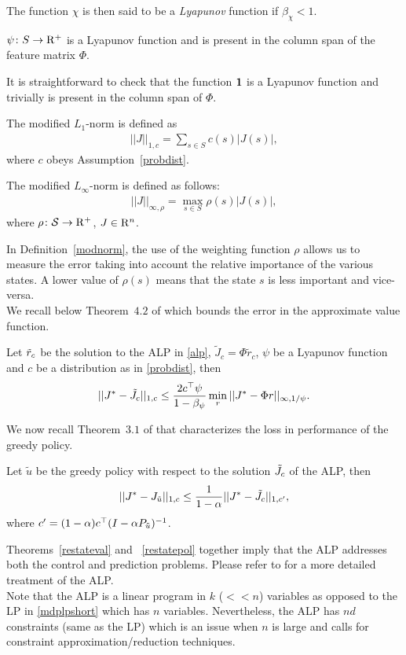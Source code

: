 \begin{definition}
The function $\chi$ is then said to be a \emph{Lyapunov} function if $\beta_{\chi}<1$.
\end{definition}
\begin{assumption}\label{lyap}
$\psi\colon S \rightarrow \mathrm{R}^+$ is a Lyapunov function and is present in the column span of the feature matrix $\Phi$.
\end{assumption}
It is straightforward to check that the function $\mathbf{1}$ is a Lyapunov function and trivially is present in the column span of $\Phi$. 
\begin{definition}\label{modlone}
The modified $L_1$-norm is defined as
\begin{align}
||J||_{1,c}=\sum_{s \in S} c(s)|J(s)|,
\end{align}
where $c$ obeys Assumption~\ref{probdist}.
\end{definition}
\begin{definition}\label{modnorm}
The modified $L_\infty$-norm is defined as follows:
\begin{align}
||J||_{\infty,\rho}=\max_{s \in S} \rho(s) |J(s)|,
\end{align}
where $\rho \colon \mathcal{S} \rightarrow \mathrm{R}^+$, $J\in \mathrm{R}^n$.
\end{definition}
In Definition~\ref{modnorm}, the use of the weighting function $\rho$ allows us to measure the error taking into account the relative importance of the various states. A lower value of $\rho(s)$ means that the state $s$ is less important and vice-versa.\\
We recall below Theorem~$4.2$ of \cite{ALP} which bounds the error in the approximate value function.
\begin{theorem}\label{restateval}
Let $\tilde{r}_c$ be the solution to the ALP in \eqref{alp}, $\tilde{J}_c=\Phi \tilde{r}_c$, $\psi$ be a Lyapunov function and $c$ be a distribution as in \eqref{probdist}, then 
\begin{align}
||J^*-\tilde{J}_c||_{1,c}\leq \frac{2c^\top \psi}{1-\beta_{\psi}}\min_{r}||J^*-\Phi r||_{\infty,1/\psi}.
\end{align}
\end{theorem}
We now recall Theorem~$3.1$ of \cite{ALP} that characterizes the loss in performance of the greedy policy.
\begin{theorem}\label{restatepol}
Let $\tilde{u}$ be the greedy policy with respect to the solution $\tilde{J}_c$ of the ALP, then 
\begin{align}
||J^*-J_{\tilde{u}}||_{1,c}\leq \frac{1}{1-\alpha}||J^*-\tilde{J}_c||_{1,c'},
\end{align}
where $c'=(1-\alpha)c^\top(I-\alpha P_{\tilde{u}})^{-1}$.
\end{theorem}
Theorems~\ref{restateval} and ~\ref{restatepol} together imply that the ALP addresses both the control and prediction problems. Please refer to \cite{ALP} for a more detailed treatment of the ALP.\\
Note that the ALP is a linear program in $k$ ($<<n$) variables as opposed to the LP in \eqref{mdplpshort} which has $n$ variables. Nevertheless, the ALP has $nd$ constraints (same as the LP) which is an issue when $n$ is large and calls for constraint approximation/reduction techniques.
